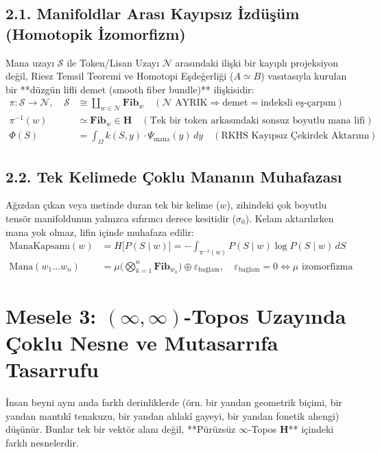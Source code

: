 \documentclass[11pt, a4paper]{article}
\begin{document}
\subsection{2.1. Manifoldlar Arası Kayıpsız İzdüşüm (Homotopik İzomorfizm)}
Mana uzayı $\mathcal{S}$ ile Token/Lisan Uzayı $\mathcal{N}$ arasındaki ilişki bir kayıplı projeksiyon değil, Riesz Temsil Teoremi ve Homotopi Eşdeğerliği ($A \simeq B$) vasıtasıyla kurulan bir **düzgün lifli demet (smooth fiber bundle)** ilişkisidir:
\begin{align}
\pi : \mathcal{S} \to \mathcal{N}, \quad \mathcal{S} &\cong \coprod_{w \in \mathcal{N}} \mathbf{Fib}_w \quad (\mathcal{N} \text{ AYRIK} \Rightarrow \text{demet} = \text{indeksli eş-çarpım}) \\
\pi^{-1}(w) &\simeq \mathbf{Fib}_w \in \mathbf{H} \quad (\text{Tek bir token arkasındaki sonsuz boyutlu mana lifi}) \\
\Phi(S) &= \int_{\Omega} k(S, y) \cdot \Psi_{\text{mana}}(y) \, dy \quad (\text{RKHS Kayıpsız Çekirdek Aktarımı})
\end{align}

\subsection{2.2. Tek Kelimede Çoklu Mananın Muhafazası}
Ağızdan çıkan veya metinde duran tek bir kelime ($w$), zihindeki çok boyutlu tensör manifoldunun yalnızca sıfırıncı derece kesitidir ($\sigma_0$). Kelam aktarılırken mana yok olmaz, lifin içinde muhafaza edilir:
\begin{align}
\text{ManaKapsamı}(w) &= H\big[ P(S \mid w) \big] = -\int_{\pi^{-1}(w)} P(S \mid w) \log P(S \mid w) \, dS \\
\text{Mana}(w_1 \dots w_n) &= \mu\Big( \bigotimes_{k=1}^n \mathbf{Fib}_{w_k} \Big) \oplus \varepsilon_{\text{bağlam}}, \quad \varepsilon_{\text{bağlam}} = 0 \iff \mu \text{ izomorfizma}
\end{align}

\section{Mesele 3: $(\infty, \infty)$-Topos Uzayında Çoklu Nesne ve Mutasarrıfa Tasarrufu}

İnsan beyni aynı anda farklı derinliklerde (örn. bir yandan geometrik biçimi, bir yandan mantıkî tenakuzu, bir yandan ahlakî gayeyi, bir yandan fonetik ahengi) düşünür. Bunlar tek bir vektör alanı değil, **Pürüzsüz $\infty$-Topos $\mathbf{H}$** içindeki farklı nesnelerdir.
\end{document}
